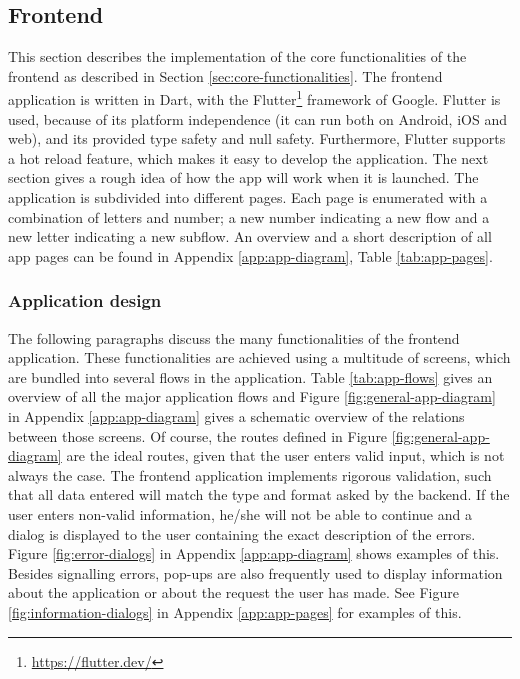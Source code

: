 \subsection{Frontend}\label{sec:implementation-frontend}
This section describes the implementation of the core functionalities of the frontend as described in Section \ref{sec:core-functionalities}. The frontend application is written in Dart, with the Flutter\footnote{\url{https://flutter.dev/}} framework of Google. Flutter is used, because of its platform independence (it can run both on Android, iOS and web), and its provided type safety and null safety. Furthermore, Flutter supports a hot reload feature, which makes it easy to develop the application. The next section gives a rough idea of how the app will work when it is launched. The application is subdivided into different pages. Each page is enumerated with a combination of letters and number; a new number indicating a new flow and a new letter indicating a new subflow. An overview and a short description of all app pages can be found in Appendix \ref{app:app-diagram}, Table \ref{tab:app-pages}.

\subsubsection{Application design}
The following paragraphs discuss the many functionalities of the frontend application. These functionalities are achieved using a multitude of screens, which are bundled into several flows in the application. Table \ref{tab:app-flows} gives an overview of all the major application flows and Figure \ref{fig:general-app-diagram} in Appendix \ref{app:app-diagram} gives a schematic overview of the relations between those screens. Of course, the routes defined in Figure \ref{fig:general-app-diagram} are the ideal routes, given that the user enters valid input, which is not always the case. The frontend application implements rigorous validation, such that all data entered will match the type and format asked by the backend. If the user enters non-valid information, he/she will not be able to continue and a dialog is displayed to the user containing the exact description of the errors. Figure \ref{fig:error-dialogs} in Appendix \ref{app:app-diagram} shows examples of this. Besides signalling errors, pop-ups are also frequently used to display information about the application or about the request the user has made. See Figure \ref{fig:information-dialogs} in Appendix \ref{app:app-pages} for examples of this.

